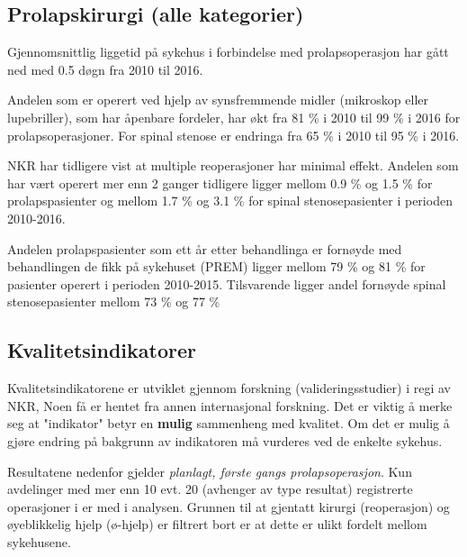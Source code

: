 \documentclass [norsk,a4paper,twoside]{article}\usepackage[]{graphicx}\usepackage[]{color}
\begin{document}
\subsection{Prolapskirurgi (alle kategorier)}



Gjennomsnittlig liggetid på sykehus i forbindelse med prolapsoperasjon har gått ned med 0.5 døgn fra 2010 til 2016.




Andelen som er operert ved hjelp av synsfremmende midler (mikroskop eller
lupebriller), som har åpenbare fordeler, har økt fra 81 \% i 2010 til 
99 \% i 2016 for prolapsoperasjoner. For spinal stenose er endringa fra 65 \% i 2010 til 
95 \% i 2016.





NKR har tidligere vist at multiple reoperasjoner har minimal effekt. Andelen som har vært operert mer enn 2 ganger tidligere ligger mellom 0.9 \%
og 1.5 \% for prolapspasienter og mellom 1.7 \%
og 3.1 \% for spinal stenosepasienter i perioden 2010-2016. 

Andelen prolapspasienter som ett år etter behandlinga er fornøyde med behandlingen de fikk på sykehuset (PREM) ligger mellom 79 \% og 81 \% for pasienter operert i perioden 2010-2015. 
Tilsvarende ligger andel fornøyde spinal stenosepasienter mellom 73 \% og 77 \%

\clearpage

\subsection{Kvalitetsindikatorer}

Kvalitetsindikatorene er  utviklet gjennom forskning (valideringsstudier)  i regi av NKR, Noen få er hentet fra annen internasjonal forskning.  Det er viktig å merke seg at "indikator" betyr en \textbf{mulig} sammenheng med kvalitet. Om det er mulig å gjøre endring på bakgrunn av indikatoren må vurderes ved de enkelte sykehus.




Resultatene nedenfor gjelder  \textit{planlagt, første gangs prolapsoperasjon}. 
Kun avdelinger med mer enn 10 evt. 20 (avhenger av type resultat) registrerte operasjoner i er med i
analysen. Grunnen til at gjentatt kirurgi (reoperasjon) og øyeblikkelig hjelp (ø-hjelp)
er filtrert bort er at dette er ulikt fordelt mellom sykehusene.
\end{document}
